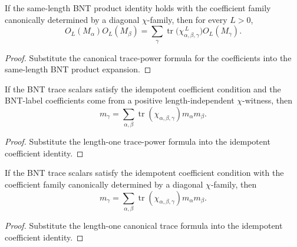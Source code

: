 \begin{theorem}%
    \label{thm:mpdo_bnt_label_same_length_product_eq_sum_of_chi_trace_pow}
    \leanok
    If the same-length BNT product identity holds with the coefficient family
    canonically determined by a diagonal $\chi$-family, then for every
    $L>0$,
    \[
        O_L(M_\alpha)O_L(M_\beta)
        = \sum_\gamma
        \operatorname{tr}\bigl(    \chi_{\alpha,\beta,\gamma}^{\,L}
        \bigr) O_L(M_\gamma).
    \]
\end{theorem}
\begin{proof}\leanok
    Substitute the canonical trace-power formula for the coefficients into the
    same-length BNT product expansion.
\end{proof}

\begin{theorem}%
    \label{thm:mpdo_bnt_label_idempotent_eq_sum_chi_trace}
    \leanok
    If the BNT trace scalars satisfy the idempotent coefficient condition and
    the BNT-label coefficients come from a positive length-independent
    $\chi$-witness, then
    \[
        m_\gamma =
        \sum_{\alpha,\beta}
        \operatorname{tr}(\chi_{\alpha,\beta,\gamma})
        m_\alpha m_\beta.
    \]
\end{theorem}
\begin{proof}\leanok
    Substitute the length-one trace-power formula into the idempotent
    coefficient identity.
\end{proof}

\begin{theorem}%
    \label{thm:mpdo_bnt_label_idempotent_eq_sum_of_chi_trace}
    \leanok
    If the BNT trace scalars satisfy the idempotent coefficient condition with
    the coefficient family canonically determined by a diagonal
    $\chi$-family, then
    \[
        m_\gamma =
        \sum_{\alpha,\beta}
        \operatorname{tr}(\chi_{\alpha,\beta,\gamma})
        m_\alpha m_\beta.
    \]
\end{theorem}
\begin{proof}\leanok
    Substitute the length-one canonical trace formula into the idempotent
    coefficient identity.
\end{proof}

